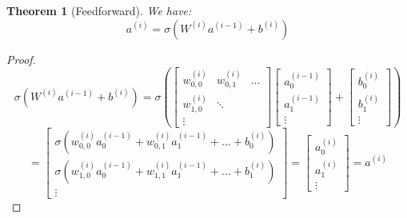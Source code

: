 \documentclass{article}
\newtheorem{theorem}{Theorem}[section]
\theoremstyle{definition}
\theoremstyle{remark}
\theoremstyle{example}
\begin{document}
\begin{theorem}[Feedforward]
    We have:
        $$a^{(i)} = \sigma(W^{(i)}a^{(i-1)} + b^{(i)})$$
\end{theorem}

\begin{proof}
    $$\sigma(W^{(i)}a^{(i-1)} + b^{(i)}) =
    \sigma\left(
        \begin{bmatrix}
            w_{0, 0}^{(i)} &  w_{0,1}^{(i)} & \dots\\
            w_{1, 0}^{(i)} &  \ddots\\
            \vdots
        \end{bmatrix}
        \begin{bmatrix}
            a_0^{(i-1)}\\
            a_1^{(i-1)}\\
            \vdots
        \end{bmatrix}
        +
        \begin{bmatrix}
            b_0^{(i)}\\
            b_1^{(i)}\\
            \vdots
        \end{bmatrix}
        \right)$$
    $$=  \begin{bmatrix}
            \sigma(w_{0,0}^{(i)} a_0^{(i-1)} + w_{0,1}^{(i)} a_1^{(i-1)} + \dots + b_0^{(i)})\\
            \sigma(w_{1,0}^{(i)} a_0^{(i-1)} + w_{1,1}^{(i)} a_1^{(i-1)} + \dots + b_1^{(i)})\\
            \vdots
        \end{bmatrix}
    = \begin{bmatrix} a_0^{(i)}\\ a_1^{(i)}\\ \vdots \end{bmatrix}
    = a^{(i)}$$
\end{proof}





\end{document}
